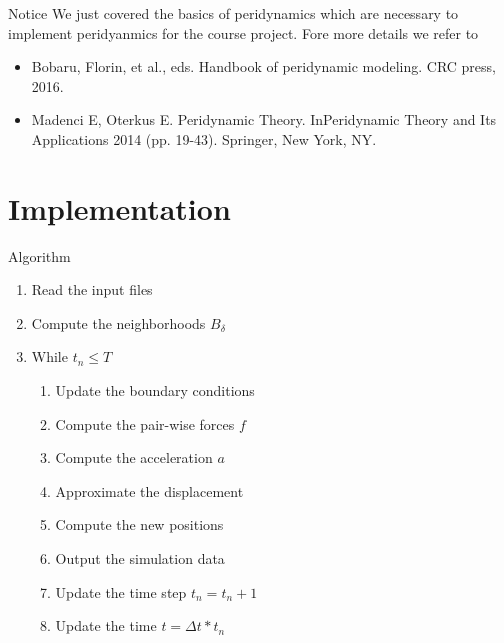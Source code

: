 \documentclass[12pt,t]{beamer}
\begin{document}
\begin{frame}{Notice}
We just covered the basics of peridynamics which are necessary to implement peridyanmics for the course project. Fore more details we refer to 
\begin{itemize}
\item Bobaru, Florin, et al., eds. Handbook of peridynamic modeling. CRC press, 2016.
\item Madenci E, Oterkus E. Peridynamic Theory. InPeridynamic Theory and Its Applications 2014 (pp. 19-43). Springer, New York, NY.
\end{itemize}

\end{frame}

\section{Implementation}

\begin{frame}{Algorithm}

\begin{enumerate}
\item Read the input files
\item Compute the neighborhoods $B_\delta$
\item While $t_n \leq T$
\begin{enumerate}
\item Update the boundary conditions 
\item Compute the pair-wise forces $f$
\item Compute the acceleration $a$
\item Approximate the displacement
\item Compute the new positions
\item Output the simulation data
\item Update the time step $t_n = t_n + 1$
\item Update the time $t=\Delta t * t_n$
\end{enumerate} 
\end{enumerate}

\end{frame}


\end{document}
